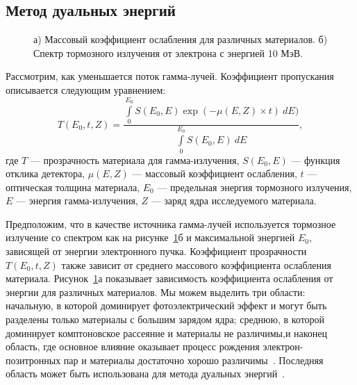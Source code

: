 \subsection{Метод дуальных энергий}
\begin{figure}[t]
    \begin{center}
        \begin{minipage}[h]{0.49\linewidth}
        \end{minipage}
        \hfill
        \begin{minipage}[h]{0.49\linewidth}
        \end{minipage}
        \caption{а) Массовый коэффициент ослабления для различных материалов. б) Спектр тормозного излучения от электрона с энергией 10 МэВ.}
    \end{center}
    \label{pic:att}
\end{figure}

Рассмотрим, как уменьшается поток гамма-лучей. Коэффициент пропускания описывается следующим уравнением:
\begin{equation}
\label{eq:trans}
T(E_0, t, Z) = \frac{\int \limits_0^{E_0} S(E_0, E) \exp(-\mu(E,Z)\times t)~dE)}{\int \limits_0^{E_0} S(E_0, E)~dE},
\end{equation}
где $T$ --- прозрачность материала для гамма-излучения, $S(E_0, E)$ --- функция отклика детектора, $\mu(E,Z)$ --- массовый коэффициент ослабления, $t$ ---  оптическая толщина материала, $E_0$ --- предельная энергия тормозного излучения, $E$ --- энергия гамма-излучения, $Z$ --- заряд ядра исследуемого материала.

Предположим, что в качестве источника гамма-лучей используется тормозное излучение со спектром как на рисунке~\ref{pic:att}б и максимальной энергией $E_0$, зависящей от энергии электронного пучка. Коэффициент прозрачности  $T(E_0, t, Z)$ также зависит от среднего массового коэффициента ослабления материала. Рисунок~\ref{pic:att}а показывает зависимость коэффициента ослабления от энергии для различных материалов. Мы можем выделить три области: начальную, в которой доминирует фотоэлектрический эффект и могут быть разделены только материалы с большим зарядом ядра; среднюю, в которой доминирует комптоновское рассеяние и материалы не различимы,и наконец область, где основное влияние оказывает процесс рождения электрон-позитронных пар и материалы достаточно хорошо различимы~\cite{geheitler1984quantum, spirin, Geant2016}. Последняя область может быть использована для метода дуальных энергий~\cite{spirin}.

